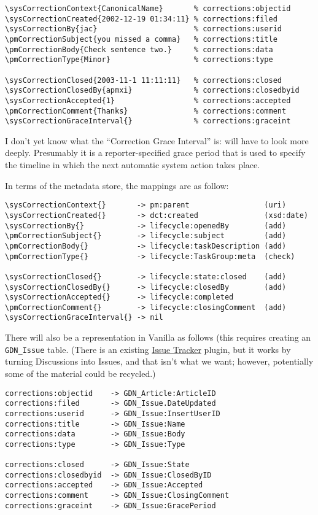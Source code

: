 \documentclass{article}
\begin{document}
\begin{verbatim}
\sysCorrectionContext{CanonicalName}       % corrections:objectid
\sysCorrectionCreated{2002-12-19 01:34:11} % corrections:filed
\sysCorrectionBy{jac}                      % corrections:userid
\pmCorrectionSubject{you missed a comma}   % corrections:title
\pmCorrectionBody{Check sentence two.}     % corrections:data
\pmCorrectionType{Minor}                   % corrections:type

\sysCorrectionClosed{2003-11-1 11:11:11}   % corrections:closed
\sysCorrectionClosedBy{apmxi}              % corrections:closedbyid
\sysCorrectionAccepted{1}                  % corrections:accepted
\pmCorrectionComment{Thanks}               % corrections:comment
\sysCorrectionGraceInterval{}              % corrections:graceint
\end{verbatim}

I don't yet know what the ``Correction Grace Interval''
is: will have to look more deeply.  Presumably it is a
reporter-specified grace period that is used to specify
the timeline in which the next automatic system action
takes place.

In terms of the metadata store, the mappings are as
follow:

\begin{verbatim}
\sysCorrectionContext{}       -> pm:parent                 (uri)
\sysCorrectionCreated{}       -> dct:created               (xsd:date)
\sysCorrectionBy{}            -> lifecycle:openedBy        (add)
\pmCorrectionSubject{}        -> lifecycle:subject         (add)
\pmCorrectionBody{}           -> lifecycle:taskDescription (add)
\pmCorrectionType{}           -> lifecycle:TaskGroup:meta  (check)

\sysCorrectionClosed{}        -> lifecycle:state:closed    (add)
\sysCorrectionClosedBy{}      -> lifecycle:closedBy        (add)
\sysCorrectionAccepted{}      -> lifecycle:completed
\pmCorrectionComment{}        -> lifecycle:closingComment  (add)
\sysCorrectionGraceInterval{} -> nil
\end{verbatim}

There will also be a representation in Vanilla as follows
(this requires creating an \verb|GDN_Issue| table.  (There
is an existing
\href{http://vanillaforums.org/addon/584-issue-tracker}{Issue
  Tracker} plugin, but it works by turning Discussions
into Issues, and that isn't what we want; however,
potentially some of the material could be recycled.)

\begin{verbatim}
corrections:objectid    -> GDN_Article:ArticleID
corrections:filed       -> GDN_Issue.DateUpdated
corrections:userid      -> GDN_Issue:InsertUserID
corrections:title       -> GDN_Issue:Name
corrections:data        -> GDN_Issue:Body
corrections:type        -> GDN_Issue:Type

corrections:closed      -> GDN_Issue:State
corrections:closedbyid  -> GDN_Issue:ClosedByID
corrections:accepted    -> GDN_Issue:Accepted
corrections:comment     -> GDN_Issue:ClosingComment
corrections:graceint    -> GDN_Issue:GracePeriod
\end{verbatim}
\end{document}
